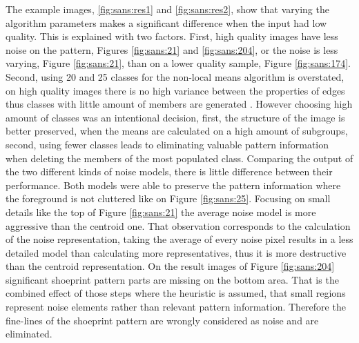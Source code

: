 \documentclass[draft,final]{vutinfth} %
\begin{document}
\par
The example images,  \ref{fig:sans:res1} and \ref{fig:sans:res2}, show that varying the algorithm parameters makes a significant difference when the input had low quality.
This is explained with two factors.
First, high quality images have less noise on the pattern, Figures \ref{fig:sans:21} and \ref{fig:sans:204}, or the noise is less varying, Figure \ref{fig:sans:21}, than on a lower quality sample, Figure \ref{fig:sans:174}.
Second, using 20 and 25 classes for the non-local means algorithm is overstated, on high quality images there is no high variance between the properties of edges thus classes with little amount of members are generated .
However choosing high amount of classes was an intentional decision, first, the structure of the image is better preserved, when the means are calculated on a high amount of subgroups, second, using fewer classes leads to eliminating valuable pattern information when deleting the members of the most populated class.
Comparing the output of the two different kinds of noise models, there is little difference between their performance.
Both models were able to preserve the pattern information where the foreground is not cluttered like on Figure \ref{fig:sans:25}.
Focusing on small details like the top of Figure \ref{fig:sans:21} the average noise model is more aggressive than the centroid one.
That observation corresponds to the calculation of the noise representation, taking the average of every noise pixel results in a less detailed model than calculating more representatives, thus it is more destructive than the centroid representation.
On the result images of Figure \ref{fig:sans:204} significant shoeprint pattern parts are missing on the bottom area.
That is the combined effect of those steps where the heuristic is assumed, that small regions represent noise elements rather than relevant pattern information.
Therefore the fine-lines of the shoeprint pattern are wrongly considered as noise and are eliminated.
\end{document}
